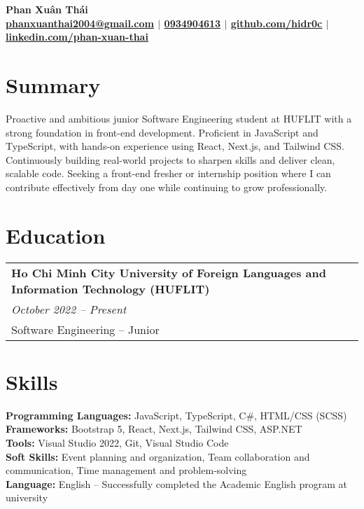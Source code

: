 \documentclass[a4paper,11pt]{article}
\begin{document}
\pagestyle{empty}

\begin{center}
\LARGE\textbf{Phan Xuân Thái} \\[5pt]
\small\textbf{\href{mailto:phanxuanthai2004@gmail.com}{phanxuanthai2004@gmail.com} $|$ 
\href{tel:0934904613}{0934904613} $|$ 
\href{https://github.com/hidr0c}{\textbf{\underline{github.com/hidr0c}}} $|$ 
\href{https://www.linkedin.com/in/xuân-thái-phan-bab693352/}{\textbf{\underline{linkedin.com/phan-xuan-thai}}} 
} \\[2pt]
\end{center}

\section{Summary}
Proactive and ambitious junior Software Engineering student at HUFLIT with a strong foundation in front-end development. Proficient in JavaScript and TypeScript, with hands-on experience using React, Next.js, and Tailwind CSS. Continuously building real-world projects to sharpen skills and deliver clean, scalable code. Seeking a front-end fresher or internship position where I can contribute effectively from day one while continuing to grow professionally.

\section{Education}
\begin{tabularx}{\linewidth}{@{}l@{}}
\textbf{Ho Chi Minh City University of Foreign Languages and Information Technology (HUFLIT)} \\
\small\textit{October 2022 -- Present} \\
Software Engineering -- Junior
\end{tabularx}

\section{Skills}
\textbf{Programming Languages:} JavaScript, TypeScript, C\#, HTML/CSS (SCSS) \\
\textbf{Frameworks:} Bootstrap 5, React, Next.js, Tailwind CSS, ASP.NET \\
\textbf{Tools:} Visual Studio 2022, Git, Visual Studio Code \\
\textbf{Soft Skills:} Event planning and organization, Team collaboration and communication, Time management and problem-solving \\
\textbf{Language:} English – Successfully completed the Academic English program at university
\end{document}

